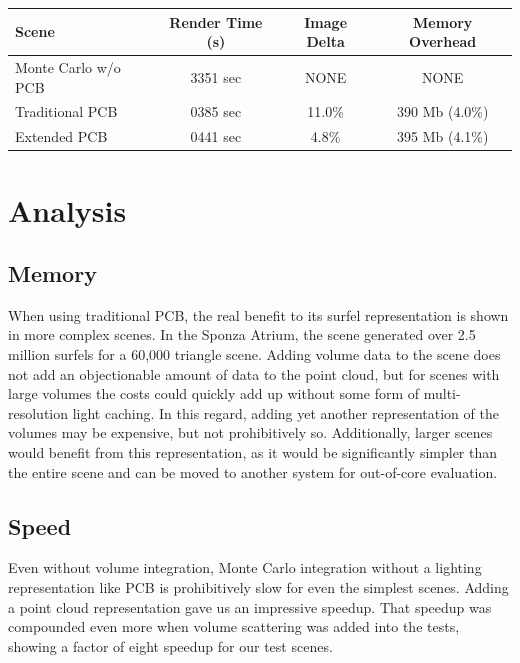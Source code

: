 \documentclass[12pt]{ucthesis}
\begin{document}
\begin{center}
\setlength{\tabcolsep}{5pt}
\begin{tabular}{ | l | c | c | c | }
  \hline                       
  Scene & Render Time (s) & Image Delta & Memory Overhead \\
  \hline                  
  Monte Carlo w/o PCB & 3351 sec & NONE & NONE \\
  Traditional PCB & 0385 sec & 11.0\% & 390 Mb (4.0\%) \\
  Extended PCB & 0441 sec & 4.8\% & 395 Mb (4.1\%)  \\
  \hline  
\end{tabular}
\end{center}


\section{Analysis}

\subsection{Memory}
When using traditional PCB, the real benefit to its surfel representation is shown in more complex scenes.  In the Sponza Atrium, the scene generated over 2.5 million surfels for a 60,000 triangle scene.  Adding volume data to the scene does not add an objectionable amount of data to the point cloud, but for scenes with large volumes the costs could quickly add up without some form of multi-resolution light caching.  In this regard, adding yet another representation of the volumes may be expensive, but not prohibitively so.  Additionally, larger scenes would benefit from this representation, as it would be significantly simpler than the entire scene and can be moved to another system for out-of-core evaluation.

\subsection{Speed}
Even without volume integration, Monte Carlo integration without a lighting representation like PCB is prohibitively slow for even the simplest scenes.  Adding a point cloud representation gave us an impressive speedup.  That speedup was compounded even more when volume scattering was added into the tests, showing a factor of eight speedup for our test scenes.
\end{document}
